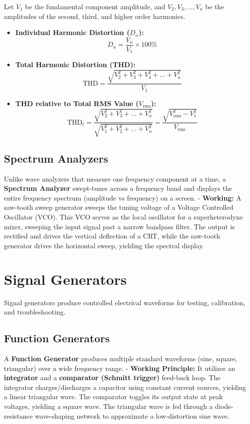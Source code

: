\documentclass[12pt,a4paper]{article}
\begin{document}
\begin{tcolorbox}[formulabox, title={\textbf{Harmonic Distortion Calculations}}]
Let $V_1$ be the fundamental component amplitude, and $V_2, V_3, \dots, V_n$ be the amplitudes of the second, third, and higher order harmonics.
\begin{itemize}[leftmargin=*, itemsep=3.5pt, topsep=0pt]
  \item \textbf{Individual Harmonic Distortion ($D_n$):}
    $$D_n = \frac{V_n}{V_1} \times 100\%$$
  \item \textbf{Total Harmonic Distortion (THD):}
    $$\text{THD} = \frac{\sqrt{V_2^2 + V_3^2 + V_4^2 + \dots + V_n^2}}{V_1}$$
  \item \textbf{THD relative to Total RMS Value ($V_{\text{rms}}$):}
    $$\text{THD}_t = \frac{\sqrt{V_2^2 + V_3^2 + \dots + V_n^2}}{\sqrt{V_1^2 + V_2^2 + \dots + V_n^2}} = \frac{\sqrt{V_{\text{rms}}^2 - V_1^2}}{V_{\text{rms}}}$$
\end{itemize}
\end{tcolorbox}

\subsection{Spectrum Analyzers}
Unlike wave analyzers that measure one frequency component at a time, a \textbf{Spectrum Analyzer} swept-tunes across a frequency band and displays the entire frequency spectrum (amplitude vs frequency) on a screen.
- \textbf{Working:} A saw-tooth sweep generator sweeps the tuning voltage of a Voltage Controlled Oscillator (VCO). This VCO serves as the local oscillator for a superheterodyne mixer, sweeping the input signal past a narrow bandpass filter. The output is rectified and drives the vertical deflection of a CRT, while the saw-tooth generator drives the horizontal sweep, yielding the spectral display.

\section{Signal Generators}

Signal generators produce controlled electrical waveforms for testing, calibration, and troubleshooting.

\subsection{Function Generators}
A \textbf{Function Generator} produces multiple standard waveforms (sine, square, triangular) over a wide frequency range.
- \textbf{Working Principle:} It utilizes an \textbf{integrator} and a \textbf{comparator (Schmitt trigger)} feed-back loop. The integrator charges/discharges a capacitor using constant current sources, yielding a linear triangular wave. The comparator toggles its output state at peak voltages, yielding a square wave. The triangular wave is fed through a diode-resistance wave-shaping network to approximate a low-distortion sine wave.
\end{document}
